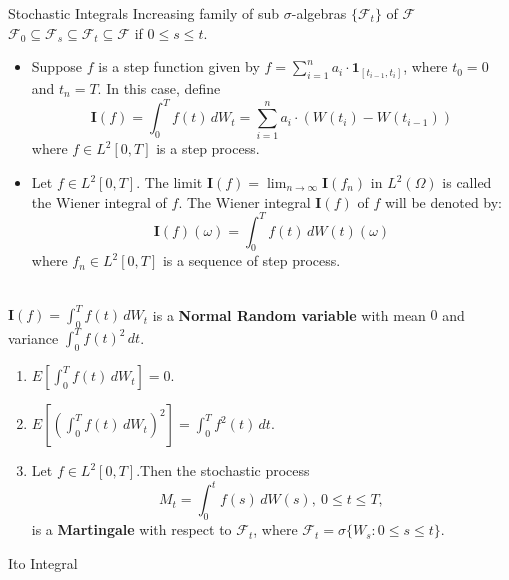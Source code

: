 \documentclass[final]{beamer}
\newlength{\colwidth}
\begin{document}
\begin{frame}[t]
\begin{columns}[t]
\begin{column}{\colwidth}
\begin{block}{Stochastic Integrals}
   Increasing family of sub $\sigma$-algebras $\{\mathcal{F}_t\}$ of $\mathcal{F}$\\
       $\mathcal{F}_0  \subseteq \mathcal{F}_s  \subseteq \mathcal{F}_t  \subseteq \mathcal{F}$ if $0 \leq s \leq t$.
   \\
        \begin{itemize}
        \item Suppose $f$ is a step function given by $f = \sum_{i=1}^n a_i \cdot \mathbf{1}_{[t_{i-1}, t_i]}$, where $t_0 = 0$ and $t_n = T$. In this case, define 
        \[\mathbf{I}(f) = \int_0^{T}{f(t)\,dW_t} = \sum_{i=1}^n a_i \cdot (W(t_i) - W(t_{i-1}))\]
        where $f \in L^2[0,T]$ is a step process.

            \item Let $f \in L^2[0,T]$. The limit $\mathbf{I}(f) = \lim_{n \to \infty} \mathbf{I}(f_n)$ in $L^2(\Omega)$ is called the Wiener integral of $f$. The Wiener integral $\mathbf{I}(f)$ of $f$ will be denoted by:
\[ \mathbf{I}(f)(\omega) = \int_{0}^{T} f(t) \, dW(t)(\omega) \]
 where $f_n \in L^2[0,T]$ is a sequence of step process.
        \end{itemize}
        
        
          \\
         $\mathbf{I}(f) = \int_0^T f(t)\,dW_t$ is a \textbf{Normal Random variable} with mean $0$ and variance $\int_0^T f(t)^{2}\,dt$.
\begin{enumerate}
    \item $E[\int_0^T f(t)\,dW_t] = 0$.
    \item $E[(\int_0^T f(t)\,dW_t)^{2}] = \int_0^T f^{2}(t)\,dt$.
    \item Let $f \in L^2[0,T]$.Then the stochastic process \[ M_t = \int_0^t f(s)\,dW(s),\ 0 \leq t \leq T,\] is a \textbf{Martingale} with respect to $\mathcal{F}_t$, where $\mathcal{F}_t = \sigma\{W_s:0\leq s\leq t\}$.
\end{enumerate}
  \end{block}

  \begin{block}{It$\hat{\text{o}}$ Integral}


\end{block}
\end{column}
\end{columns}
\end{frame}
\end{document}
